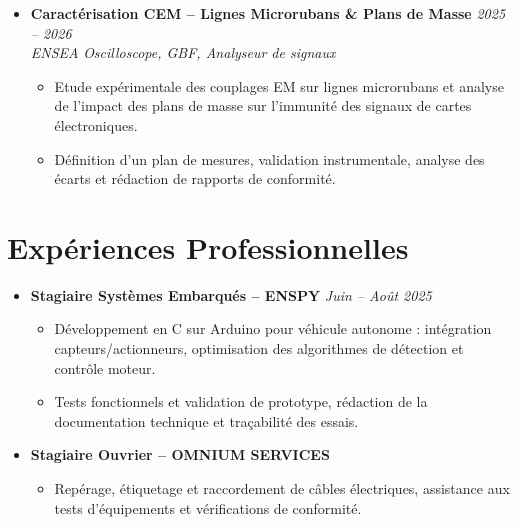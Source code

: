 \documentclass[a4paper,11pt]{article}
\begin{document}
\begin{itemize}[leftmargin=*, label={-}, itemsep=1pt]
\item \textbf{Caractérisation CEM -- Lignes Microrubans \& Plans de Masse} \hfill \textit{2025 -- 2026} \\
\textit{ENSEA} \hfill \textit{Oscilloscope, GBF, Analyseur de signaux}
\vspace{-2pt}
    \begin{itemize}[leftmargin=0.4cm, nosep, label=\tiny$\bullet$]
        \item \small{Etude expérimentale des couplages EM sur lignes microrubans et analyse de l'impact des plans de masse sur l'immunité des signaux de cartes électroniques.}
        \item \small{Définition d'un plan de mesures, validation instrumentale, analyse des écarts et rédaction de rapports de conformité.}
    \end{itemize}

\end{itemize}

\vspace{1pt}

\section{Expériences Professionnelles}
\begin{itemize}[leftmargin=*, label={-}, itemsep=1pt]

\item \textbf{Stagiaire Systèmes Embarqués -- ENSPY} \hfill \textit{Juin -- Août 2025}
\vspace{-2pt}
    \begin{itemize}[leftmargin=0.4cm, nosep, label=\tiny$\bullet$]
        \item \small{Développement en C sur Arduino pour véhicule autonome : intégration capteurs/actionneurs, optimisation des algorithmes de détection et contrôle moteur.}
        \item \small{Tests fonctionnels et validation de prototype, rédaction de la documentation technique et traçabilité des essais.}
    \end{itemize}

\item \textbf{Stagiaire Ouvrier -- OMNIUM SERVICES}
\vspace{-2pt}
    \begin{itemize}[leftmargin=0.4cm, nosep, label=\tiny$\bullet$]
        \item \small{Repérage, étiquetage et raccordement de câbles électriques, assistance aux tests d'équipements et vérifications de conformité.}
    \end{itemize}

\end{itemize}
\end{document}
